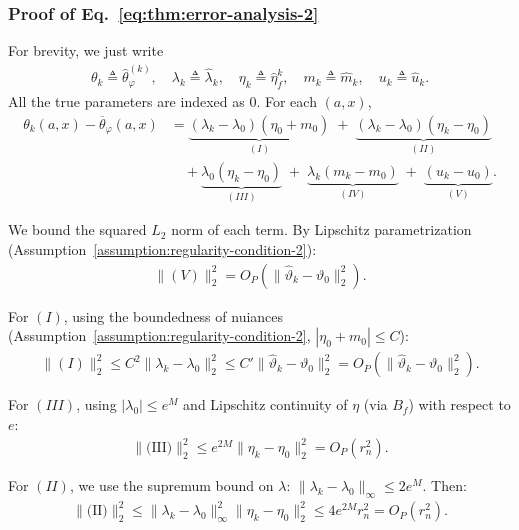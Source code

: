 \subsubsection*{Proof of Eq.~\eqref{eq:thm:error-analysis-2}}

For brevity, we just write 
\begin{align}
    \theta_k \triangleq \widehat{\theta}^{(k)}_{\varphi}, \quad \lambda_k \triangleq \widehat{\lambda}_k, \quad \eta_k \triangleq \widehat{\eta}^k_f, \quad m_k \triangleq \widehat{m}_k, \quad u_k \triangleq \widehat{u}_k. 
\end{align}
All the true parameters are indexed as $0$. For each $(a,x)$, 
\begin{align}
    \theta_k(a,x) - \overline{\theta}_{\varphi}(a,x) &= \underbrace{ (\lambda_k - \lambda_0) (\eta_0 + m_0) }_{(I)} 
                \;+\; \underbrace{ (\lambda_k - \lambda_0) (\eta_k - \eta_0) }_{(II)} \\ 
                &\quad + \underbrace{ \lambda_0(\eta_k - \eta_0) }_{(III)} 
                \;+\; \underbrace{ \lambda_k(m_k - m_0)  }_{(IV)}
                \;+\; \underbrace{ (u_k - u_0) }_{(V)}.
\end{align}

We bound the squared $L_2$ norm of each term. By Lipschitz parametrization (Assumption~\ref{assumption:regularity-condition-2}):
\begin{align}
    \| (V) \|^2_2 = O_P(\| \widehat{\vartheta}_k - \vartheta_0 \|^2_2).
\end{align}

For $(I)$, using the boundedness of nuiances (Assumption~\ref{assumption:regularity-condition-2}, $|\eta_0+m_0| \le C$):
\begin{align}
    \| (I) \|^2_2 \leq C^2 \| \lambda_k - \lambda_0\|^2_2 \leq C' \| \widehat{\vartheta}_k - \vartheta_0 \|^2_2 = O_P(\| \widehat{\vartheta}_k - \vartheta_0 \|^2_2).
\end{align}

For $(III)$, using $|\lambda_0| \le e^{M}$ and Lipschitz continuity of $\eta$ (via $B_f$) with respect to $e$:
\begin{align}
    \|\text{(III)}\|^2_2 \le e^{2M} \|\eta_k - \eta_0\|_2^2 = O_P(r^2_n).
\end{align}

For $(II)$, we use the supremum bound on $\lambda$: $\|\lambda_k - \lambda_0\|_\infty \le 2e^M$. Then:
\begin{align}
    \|\text{(II)}\|_2^2 \le \|\lambda_k-\lambda_0\|_\infty^2 \|\eta_k-\eta_0\|_2^2 \le 4e^{2M} r_n^2 = O_P(r_n^2). 
\end{align}

